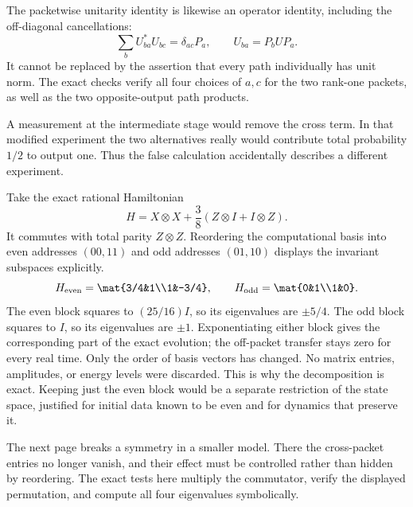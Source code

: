The packetwise unitarity identity is likewise an operator identity, including the off-diagonal cancellations:
\[
\sum_b U_{ba}^*U_{bc}=\delta_{ac}P_a,
\qquad U_{ba}=P_bUP_a.
\]
It cannot be replaced by the assertion that every path individually has unit norm. The exact checks verify all four choices of $a,c$ for the two rank-one packets, as well as the two opposite-output path products.

A measurement at the intermediate stage would remove the cross term. In that modified experiment the two alternatives really would contribute total probability $1/2$ to output one. Thus the false calculation accidentally describes a different experiment.

Take the exact rational Hamiltonian
\[
H=X\otimes X+\frac38(Z\otimes I+I\otimes Z).
\]
It commutes with total parity $Z\otimes Z$. Reordering the computational basis into even addresses $(00,11)$ and odd addresses $(01,10)$ displays the invariant subspaces explicitly.
\[
H_{\rm even}=\mat{3/4&1\\1&-3/4},\qquad
H_{\rm odd}=\mat{0&1\\1&0}.
\]
The even block squares to $(25/16)I$, so its eigenvalues are $\pm5/4$. The odd block squares to $I$, so its eigenvalues are $\pm1$. Exponentiating either block gives the corresponding part of the exact evolution; the off-packet transfer stays zero for every real time.
Only the order of basis vectors has changed. No matrix entries, amplitudes, or energy levels were discarded. This is why the decomposition is exact. Keeping just the even block would be a separate restriction of the state space, justified for initial data known to be even and for dynamics that preserve it.

The next page breaks a symmetry in a smaller model. There the cross-packet entries no longer vanish, and their effect must be controlled rather than hidden by reordering. The exact tests here multiply the commutator, verify the displayed permutation, and compute all four eigenvalues symbolically.

